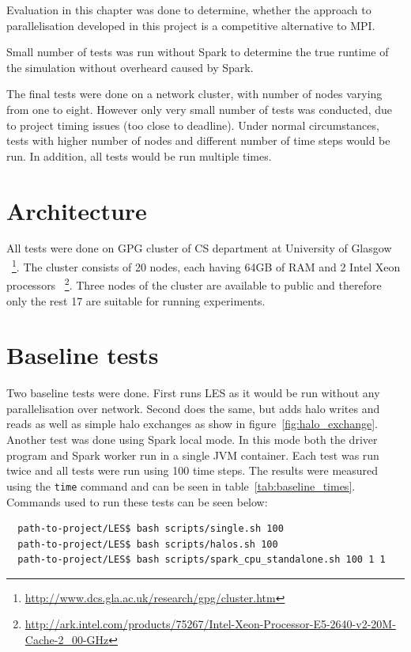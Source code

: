 \documentclass{l4proj}
\begin{document}
Evaluation in this chapter was done to determine, whether the approach to parallelisation
developed in this project is a competitive alternative to MPI.

Small number of tests was run without Spark to determine the true runtime of
the simulation without overheard caused by Spark.

The final tests were done on a network cluster, with number of nodes varying from one
to eight. However only very small number of tests was conducted, due to 
project timing issues (too close to deadline). Under normal circumstances,
tests with higher number of nodes and different number of time steps would be run.
In addition, all tests would be run multiple times.

\section{Architecture}

All tests were done on GPG cluster of CS department at University of Glasgow
~\footnote{\url{http://www.dcs.gla.ac.uk/research/gpg/cluster.htm}}.
The cluster consists of 20 nodes, each having 64GB of RAM and 2 Intel Xeon processors
~\footnote{\url{http://ark.intel.com/products/75267/Intel-Xeon-Processor-E5-2640-v2-20M-Cache-2_00-GHz}}.
Three nodes of the cluster are available to public and therefore only the rest 17 are
suitable for running experiments.

\section{Baseline tests}

Two baseline tests were done. First runs LES as it would be run without any
parallelisation over network. Second does the same, but adds halo writes and reads
as well as simple halo exchanges as show in figure~\ref{fig:halo_exchange}.
Another test was done using Spark local mode. In this mode both the driver 
program and Spark worker run in a single JVM container. Each test was run twice and 
all tests were run using 100 time steps. The results were measured using the \texttt{time} command
and can be seen in table~\ref{tab:baseline_times}. Commands used to run these tests can be seen below:
\begin{verbatim}
  path-to-project/LES$ bash scripts/single.sh 100
  path-to-project/LES$ bash scripts/halos.sh 100
  path-to-project/LES$ bash scripts/spark_cpu_standalone.sh 100 1 1
\end{verbatim}
\end{document}

